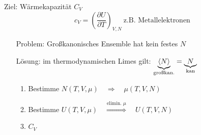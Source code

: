 Ziel: Wärmekapazität $C_V$
\begin{equation}
    c_V = \left({\frac{\partial U}{\partial T}}\right)_{V,N} \ \text{z.B. Metallelektronen}
\end{equation}
\begin{itemize}
    \item[Problem:] Großkanonisches Ensemble hat kein festes $N$
    \item[Lösung:] im thermodynamischen Limes gilt: $\underbrace{\expval{N}}_{\text{großkan.}} = \underbrace{N}_{\text{kan}}$
    \begin{enumerate}
    \item Bestimme $N(T,V,\mu) \quad \Rightarrow \quad \mu(T,V,N)$
    \item Bestimme $U(T,V,\mu) \quad \stackrel{\text{elimin. } \mu}{\Longrightarrow}\quad U(T,V,N)$
    \item $C_V$
    \end{enumerate} 
\end{itemize}

